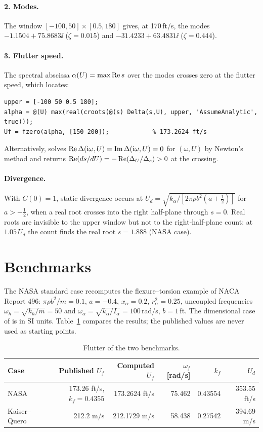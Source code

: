 \paragraph{2. Modes.} The window $[-100,50]\times[0.5,180]$ gives, at
170\,ft/s, the modes $-1.1504+75.8683\ii$ ($\zeta=0.015$) and
$-31.4233+63.4831\ii$ ($\zeta=0.444$).

\paragraph{3. Flutter speed.} The spectral abscissa
$\alpha(U)=\max\operatorname{Re} s$ over the modes crosses zero at the flutter speed,
which  locates:
\begin{lstlisting}
upper = [-100 50 0.5 180];
alpha = @(U) max(real(croots(@(s) Delta(s,U), upper, 'AssumeAnalytic', true)));
Uf = fzero(alpha, [150 200]);            % 173.2624 ft/s
\end{lstlisting}
Alternatively,  solves
$\operatorname{Re}\Delta(\mathrm{i}\omega,U)=\operatorname{Im}\Delta(\mathrm{i}\omega,U)=0$ for $(\omega,U)$ by
Newton's method and returns $\operatorname{Re}(ds/dU)=-\operatorname{Re}(\Delta_U/\Delta_s)>0$ at the
crossing.

\paragraph{Divergence.} With $C(0)=1$, static divergence occurs at
$U_d=\sqrt{k_\alpha/[2\pi\rho b^2(a+\frac12)]}$ for $a>-\frac12$, when a real
root crosses into the right half-plane through $s=0$. Real roots are
invisible to the upper window but not to the right-half-plane count: at
$1.05\,U_d$ the count finds the real root $s=1.888$ (NASA case).

\section{Benchmarks}

The NASA standard case \citep[Appendix C]{perry2015} recomputes the
flexure--torsion example of NACA Report 496: $\pi\rho b^2/m=0.1$, $a=-0.4$,
$x_\alpha=0.2$, $r_\alpha^2=0.25$, uncoupled frequencies
$\omega_h=\sqrt{k_h/m}=50$ and $\omega_\alpha=\sqrt{k_\alpha/I_\alpha}=100$\,rad/s,
$b=1$\,ft. The dimensional case of \citet[Table 1]{kaiser2022} is in SI
units. Table~\ref{tab:aerobench} compares the results; the published values
are never used as starting points.

\begin{table}[H]\centering\small
\caption{Flutter of the two benchmarks.}\label{tab:aerobench}
\begin{tabular}{lrrrrr}\toprule
Case & Published $U_f$ & Computed $U_f$ & $\omega_f$ [rad/s] & $k_f$ & $U_d$\\\midrule
NASA & 173.26 ft/s, $k_f=0.4355$ & 173.2624 ft/s & 75.462 & 0.43554 & 353.55 ft/s\\
Kaiser--Quero & 212.2 m/s & 212.1729 m/s & 58.438 & 0.27542 & 394.69 m/s\\
\bottomrule\end{tabular}
\end{table}

